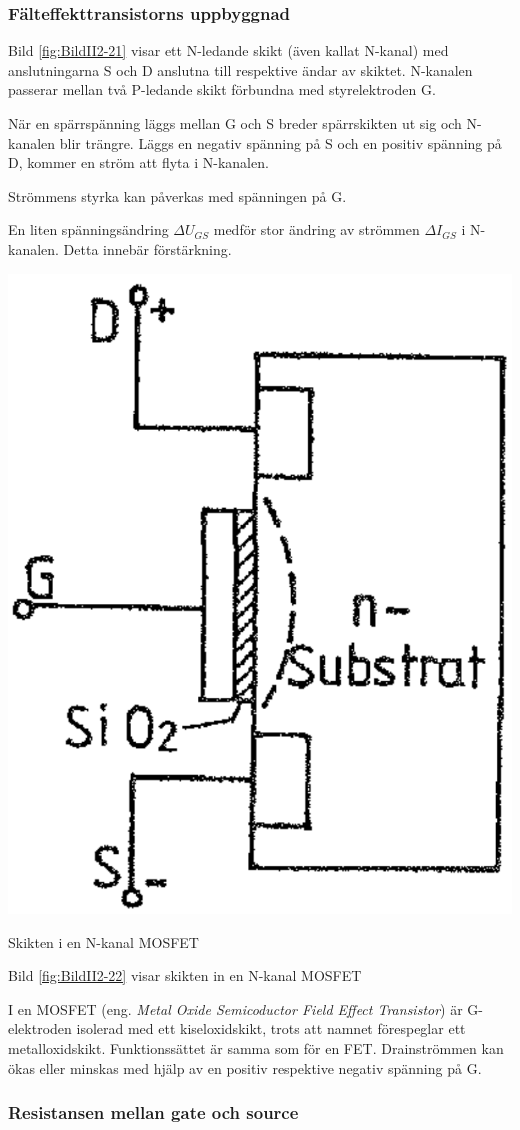 \subsubsection{Fälteffekttransistorns uppbyggnad}

Bild \ref{fig:BildII2-21} visar ett N-ledande skikt (även kallat
N-kanal) med anslutningarna S och D anslutna till respektive ändar av
skiktet. N-kanalen passerar mellan två P-ledande skikt förbundna med
styrelektroden G.

När en spärrspänning läggs mellan G och S breder spärrskikten ut sig
och N-kanalen blir trängre. Läggs en negativ spänning på S och en
positiv spänning på D, kommer en ström att flyta i N-kanalen.

Strömmens styrka kan påverkas med spänningen på G.

En liten spänningsändring \(\Delta U_{GS}\) medför stor ändring av
strömmen \(\Delta I_{GS}\) i N-kanalen. Detta innebär förstärkning.

\begin{marginfigure}
\includegraphics[width=.4\textwidth]{images/cropped_pdfs/bild_2_2-22.pdf}
\caption{Skikten i en N-kanal MOSFET}
\label{fig:BildII2-22}
\end{marginfigure}


Bild \ref{fig:BildII2-22} visar skikten in en N-kanal MOSFET

I en MOSFET (eng. \emph{Metal Oxide Semicoductor Field Effect
  Transistor}) är G-elektroden isolerad med ett kiseloxidskikt, trots
att namnet förespeglar ett metalloxidskikt. Funktionssättet är samma
som för en FET. Drainströmmen kan ökas eller minskas med hjälp av en
positiv respektive negativ spänning på G.

\subsubsection{Resistansen mellan gate och source}

